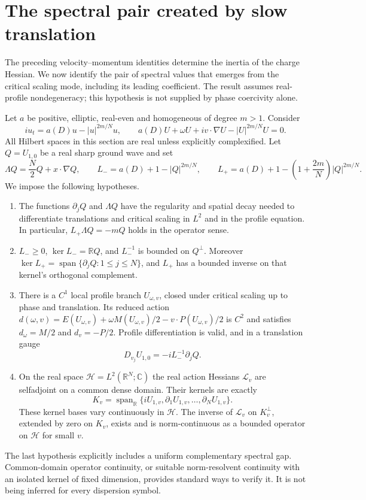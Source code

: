 \section{The spectral pair created by slow translation}
\label{sec:r11-spectral}

The preceding velocity--momentum identities determine the inertia of the
charge Hessian. We now identify the pair of spectral values that emerges
from the critical scaling mode, including its leading coefficient. The
result assumes real-profile nondegeneracy; this hypothesis is not supplied
by phase coercivity alone.

Let $a$ be positive, elliptic, real-even and homogeneous of degree $m>1$.
Consider
\[
 iu_t=a(D)u-|u|^{2m/N}u,
 \qquad
 a(D)U+\omega U+iv\cdot\nabla U-|U|^{2m/N}U=0.
\]
All Hilbert spaces in this section are real unless explicitly complexified.
Let $Q=U_{1,0}$ be a real sharp ground wave and set
\[
 \Lambda Q=\frac N2Q+x\cdot\nabla Q,\qquad
 L_-=a(D)+1-|Q|^{2m/N},\qquad
 L_+=a(D)+1-\left(1+\frac{2m}{N}\right)|Q|^{2m/N}.
\]
We impose the following hypotheses.
\begin{enumerate}
\item The functions $\partial_jQ$ and $\Lambda Q$ have the regularity and
spatial decay needed to differentiate translations and critical scaling
in $L^2$ and in the profile equation. In particular,
$L_+\Lambda Q=-mQ$ holds in the operator sense.
\item $L_-\geq0$, $\ker L_-=\mathbb RQ$, and $L_-^{-1}$ is bounded
on $Q^\perp$. Moreover
$\ker L_+=\operatorname{span}\{\partial_jQ:1\leq j\leq N\}$,
and $L_+$ has a bounded inverse on that kernel's orthogonal complement.
\item There is a $C^1$ local profile branch $U_{\omega,v}$, closed under
critical scaling up to phase and translation. Its reduced action
$d(\omega,v)=E(U_{\omega,v})+\omega M(U_{\omega,v})/2
-v\cdot P(U_{\omega,v})/2$ is $C^2$ and satisfies
$d_\omega=M/2$ and $d_v=-P/2$. Profile differentiation is valid, and in
a translation gauge
\[
 D_{v_j}U_{1,0}=-iL_-^{-1}\partial_jQ.
\]
\item On the real space $\mathcal H=L^2(\mathbb R^N;\mathbb C)$ the
real action Hessians $\mathcal L_v$ are selfadjoint on a common dense
domain. Their kernels are exactly
\[
 K_v=\operatorname{span}_{\mathbb R}
       \{iU_{1,v},\partial_1U_{1,v},\ldots,\partial_NU_{1,v}\}.
\]
These kernel bases vary continuously in $\mathcal H$. The inverse of
$\mathcal L_v$ on $K_v^\perp$, extended by zero on $K_v$, exists and is
norm-continuous as a bounded operator on $\mathcal H$ for small $v$.
\end{enumerate}
The last hypothesis explicitly includes a uniform complementary spectral
gap. Common-domain operator continuity, or suitable norm-resolvent
continuity with an isolated kernel of fixed dimension, provides standard
ways to verify it. It is not being inferred for every dispersion symbol.

